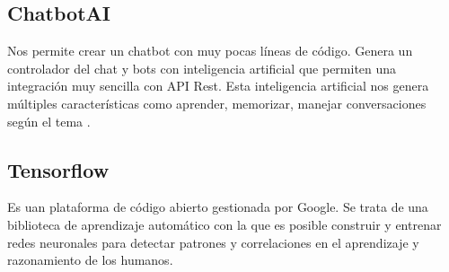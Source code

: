 \subsection{ChatbotAI} Nos permite crear un chatbot con muy pocas líneas de código. Genera un controlador del chat y bots con inteligencia artificial que permiten una integración muy sencilla con API Rest. Esta inteligencia artificial nos genera múltiples características como aprender, memorizar, manejar conversaciones según el tema \cite{chatbotAI}. 

\subsection{Tensorflow} Es uan plataforma de código abierto gestionada por Google. Se trata de una biblioteca de aprendizaje automático con la que es posible construir y entrenar redes neuronales para detectar patrones y correlaciones en el aprendizaje y razonamiento de los humanos. 